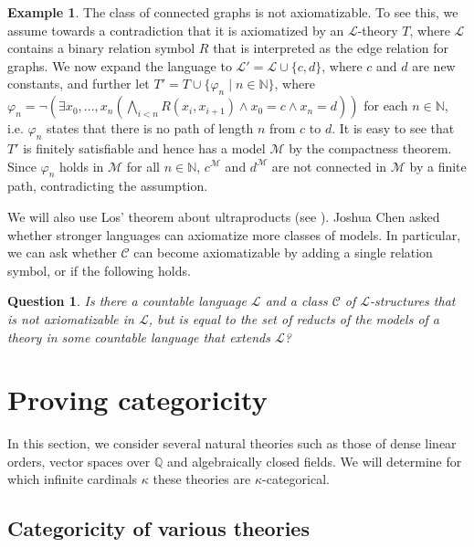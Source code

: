 \documentclass[10pt]{amsart}
\renewcommand{\L}{\mathcal{L}}
\newcommand{\QQ}{\mathbb{Q}}
\newcommand{\NNN}{\mathbb{N}}
\newcommand{\MM}{\mathcal{M}}
\newcommand{\cC}{\mathcal{C}}
\newtheorem{question}[theorem]{Question}
\theoremstyle{definition}
\newtheorem{example}[theorem]{Example}
\theoremstyle{remark}
\begin{document}
\begin{example} 
The class of connected graphs is not axiomatizable. To see this, we assume towards a contradiction that it is axiomatized by an $\L$-theory $T$, where $\L$ contains a binary relation symbol $R$ that is interpreted as the edge relation for graphs. We now expand the language to $\L'=\L\cup\{c,d\}$, where $c$ and $d$ are new constants, and further let $T'=T\cup\{\varphi_n\mid n\in\NNN\}$, where $\varphi_n=\neg(\exists x_0,\dots,x_n (\bigwedge_{i<n} R(x_i,x_{i+1}) \wedge x_0=c\wedge x_n=d))$ for each $n\in\NNN$, i.e. $\varphi_n$ states that there is no path of length $n$ from $c$ to $d$. It is easy to see that $T'$ is finitely satisfiable and hence has a model $\MM$ by the compactness theorem. Since $\varphi_n$ holds in $\MM$ for all $n\in\NNN$, $c^\MM$ and $d^\MM$ are not connected in $\MM$ by a finite path, contradicting the assumption. 
\end{example} 

We will also use Los' theorem about ultraproducts (see \cite[pp. 149-152]{MR1940513}). Joshua Chen asked whether stronger languages can axiomatize more classes of models. In particular, we can ask whether $\cC$ can become axiomatizable by adding a single relation symbol, or if the following holds. 

\begin{question} 
Is there a countable language $\L$ and a class $\cC$ of $\L$-structures that is not axiomatizable in $\L$, but is equal to the set of reducts of the models of a theory in some countable language that extends $\L$? 
\end{question} 





\section{Proving categoricity} 

In this section, we consider several natural theories such as those of dense linear orders, vector spaces over $\QQ$ and algebraically closed fields. We will determine for which infinite cardinals $\kappa$ these theories are $\kappa$-categorical. 



\subsection{Categoricity of various theories} 
\end{document}
